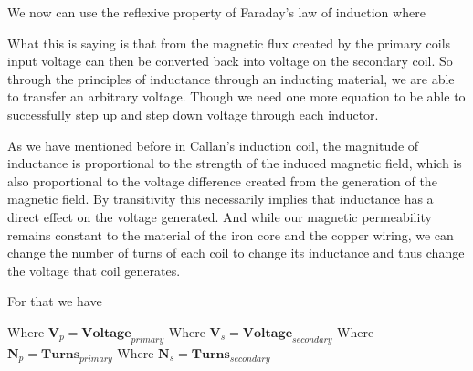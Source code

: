 \documentclass[12pt]{article}
\begin{document}
We now can use the reflexive property of Faraday's law of induction where 
\vspace{5mm}
\begin{center}
	\begin{huge}
	\end{huge}
\end{center}
\vspace{5mm}
What this is saying is that from the magnetic flux created by the primary coils input voltage can then be converted back into voltage on the secondary coil. So through the principles of inductance through an inducting material, we are able to transfer an arbitrary voltage. Though we need one more equation to be able to successfully step up and step down voltage through each inductor. 

As we have mentioned before in Callan's induction coil, the magnitude of inductance is proportional to the strength of the induced magnetic field, which is also proportional to the voltage difference created from the generation of the magnetic field. By transitivity this necessarily implies that inductance has a direct effect on the voltage generated. And while our magnetic permeability remains constant to the material of the iron core and the copper wiring, we can change the number of turns of each coil to change its inductance and thus change the voltage that coil generates.

For that we have 
\vspace{5mm}
\begin{center}
	\begin{LARGE}
		\end {LARGE}
	\end{center}
	\vspace{0mm}
	\noindent
	\begin{center}
		Where $\mathbf{V}_p = \mathbf{Voltage}_{primary}$\linebreak
		Where $\mathbf{V}_s = \mathbf{Voltage}_{secondary}$\linebreak
		Where $\mathbf{N}_p = \mathbf{Turns}_{primary}$\linebreak
		Where $\mathbf{N}_s = \mathbf{Turns}_{secondary}$\linebreak
	\end{center}
\end{document}

